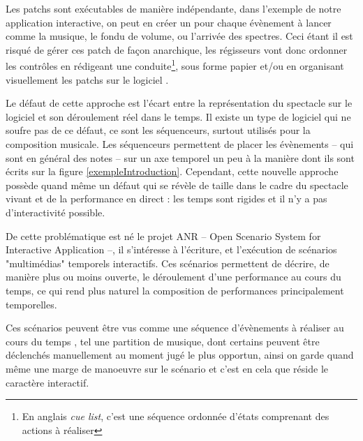 Les patchs sont exécutables de manière indépendante, dans l'exemple de notre application interactive, on peut en créer un pour chaque évènement à lancer comme la musique, le fondu de volume, ou l'arrivée des spectres. Ceci étant il est risqué de gérer ces patch de façon anarchique, les régisseurs vont donc ordonner les contrôles en rédigeant une conduite\footnote{En anglais \emph{cue list}, c'est une séquence ordonnée d'états comprenant des actions à réaliser}, sous forme papier et/ou en organisant visuellement les patchs sur le logiciel .


Le défaut de cette approche est l'écart entre la représentation du spectacle sur le logiciel et son déroulement réel dans le temps.
%
Il existe un type de logiciel qui ne soufre pas de ce défaut, ce sont les séquenceurs, surtout utilisés pour la composition musicale. Les séquenceurs permettent de placer les évènements -- qui sont en général des notes -- sur un axe temporel un peu à la manière dont ils sont écrits sur la figure \ref{exempleIntroduction}. Cependant, cette nouvelle approche possède quand même un défaut qui se révèle de taille dans le cadre du spectacle vivant et de la performance en direct : les temps sont rigides et il n'y a pas d'interactivité possible.


De cette problématique est né le projet ANR \ossia{} -- Open Scenario System for Interactive Application --, il s'intéresse à l'écriture, et l'exécution de scénarios "multimédias" temporels interactifs. Ces scénarios permettent de décrire, de manière plus ou moins ouverte, le déroulement d'une performance au cours du temps, ce qui rend plus naturel la composition de performances principalement temporelles.


Ces scénarios peuvent être vus comme une séquence d'évènements à réaliser au cours du temps , tel une partition de musique, dont certains peuvent être déclenchés manuellement au moment jugé le plus opportun, ainsi on garde quand même une marge de manoeuvre sur le scénario et c'est en cela que réside le caractère interactif.


